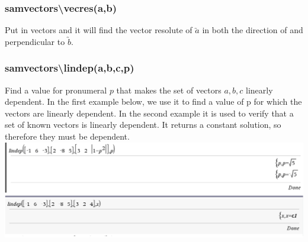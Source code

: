 \documentclass[a4paper,twoside,10pt]{article}
\begin{document}
			\subsubsection{sam\textunderscore vectors\textbackslash vecres(a,b)} Put in vectors and it will find the vector resolute of $\utilde{a}$ in both the direction of and perpendicular to $\utilde{b}$.
			\subsubsection{sam\textunderscore vectors\textbackslash lindep(a,b,c,p)} Find a value for pronumeral $p$ that makes the set of vectors $a,b,c$ linearly dependent. In the first example below, we use it to find a value of p for which the vectors are linearly dependent. In the second example it is used to verify that a set of known vectors is linearly dependent. It returns a constant solution, so therefore they must be dependent.\\
			\includegraphics[width=18cm]{lindepcas.png}
\end{document}
